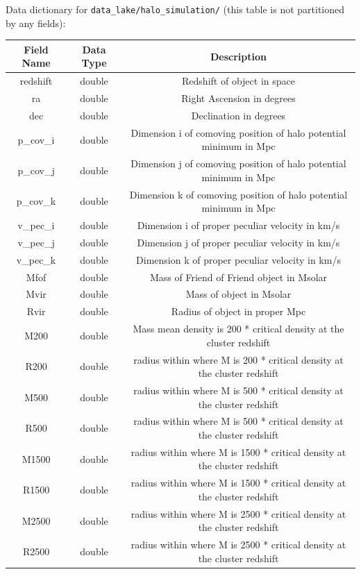 \documentclass[12pt,letterpaper]{article}
\begin{document}
Data dictionary for \texttt{data\_lake/halo\_simulation/} (this table is not
partitioned by any fields):
\begin{table}[h!]
    \centering
    \begin{tabular}{ |c|c|c| }
        \hline
        Field Name & Data Type & Description \\
        \hline
        redshift & double & Redshift of object in space \\
        ra & double & Right Ascension in degrees \\
        dec & double & Declination in degrees \\
        p\_cov\_i & double & Dimension i of comoving position of halo potential minimum in Mpc \\
        p\_cov\_j & double & Dimension j of comoving position of halo potential minimum in Mpc \\
        p\_cov\_k & double & Dimension k of comoving position of halo potential minimum in Mpc \\
        v\_pec\_i & double & Dimension i of proper peculiar velocity in km/s \\
        v\_pec\_j & double & Dimension j of proper peculiar velocity in km/s \\
        v\_pec\_k & double & Dimension k of proper peculiar velocity in km/s \\
        Mfof & double & Mass of Friend of Friend object in Msolar \\
        Mvir & double & Mass of object in Msolar \\
        Rvir & double & Radius of object in proper Mpc \\
        M200 & double & Mass mean density is 200 * critical density at the cluster redshift \\
        R200 & double & radius within where M is 200 * critical density at the cluster redshift \\
        M500 & double & radius within where M is 500 * critical density at the cluster redshift \\
        R500 & double & radius within where M is 500 * critical density at the cluster redshift \\
        M1500 & double & radius within where M is 1500 * critical density at the cluster redshift \\
        R1500 & double & radius within where M is 1500 * critical density at the cluster redshift \\
        M2500 & double & radius within where M is 2500 * critical density at the cluster redshift \\
        R2500 & double & radius within where M is 2500 * critical density at the cluster redshift \\
        \hline
    \end{tabular}
\end{table}
\end{document}
